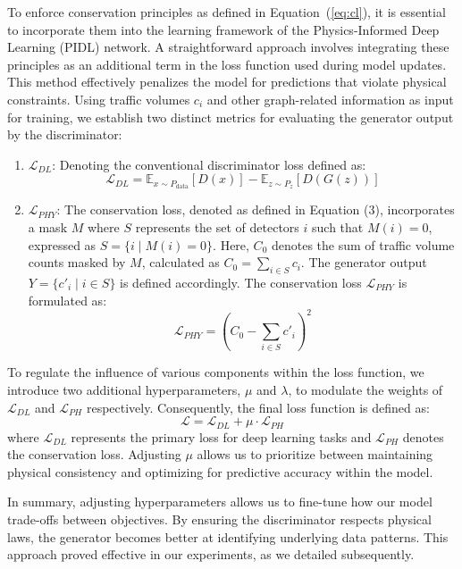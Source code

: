 To enforce conservation principles as defined in Equation~(\ref{eq:cl}), it is essential to incorporate them into the learning framework of the Physics-Informed Deep Learning (PIDL) network. A straightforward approach involves integrating these principles as an additional term in the loss function used during model updates. This method effectively penalizes the model for predictions that violate physical constraints. Using traffic volumes \( c_i \) and other graph-related information as input for training, we establish two distinct metrics for evaluating the generator output by the discriminator:
\begin{enumerate}
    \item \textbf{\( \mathcal{L}_{DL} \)}: Denoting the conventional discriminator loss defined as:
    \[ \mathcal{L}_{DL} = \mathbb{E}_{x \sim P_{\text{data}}}[D(x)] - \mathbb{E}_{z \sim P_z}[D(G(z))] \]

    \item \textbf{\( \mathcal{L}_{PHY} \)}: The conservation loss, denoted as defined in Equation (3), incorporates a mask \( M \) where \( S \) represents the set of detectors \( i \) such that \( M(i) = 0 \), expressed as \( S = \{i \mid M(i) = 0\} \). Here, \( C_0 \) denotes the sum of traffic volume counts masked by \( M \), calculated as \( C_0 = \sum_{i \in S} c_i \). The generator output \( Y = \{c'_i \mid i \in S\} \) is defined accordingly. The conservation loss \( \mathcal{L}_{PHY} \) is formulated as:
\[ \mathcal{L}_{PHY} = (C_0 - \sum_{i \in S} c'_i)^2 \]
\end{enumerate}

To regulate the influence of various components within the loss function, we introduce two additional hyperparameters, \( \mu \) and \( \lambda \), to modulate the weights of \( \mathcal{L}_{DL} \) and \( \mathcal{L}_{PH} \) respectively. Consequently, the final loss function is defined as:
\[ \mathcal{L} = \mathcal{L}_{DL} + \mu \cdot \mathcal{L}_{PH} \]
where \( \mathcal{L}_{DL} \) represents the primary loss for deep learning tasks and \( \mathcal{L}_{PH} \) denotes the conservation loss. Adjusting \( \mu \) allows us to prioritize between maintaining physical consistency and optimizing for predictive accuracy within the model.




In summary, adjusting hyperparameters allows us to fine-tune how our model trade-offs between objectives. By ensuring the discriminator respects physical laws, the generator becomes better at identifying underlying data patterns. This approach proved effective in our experiments, as we detailed subsequently.